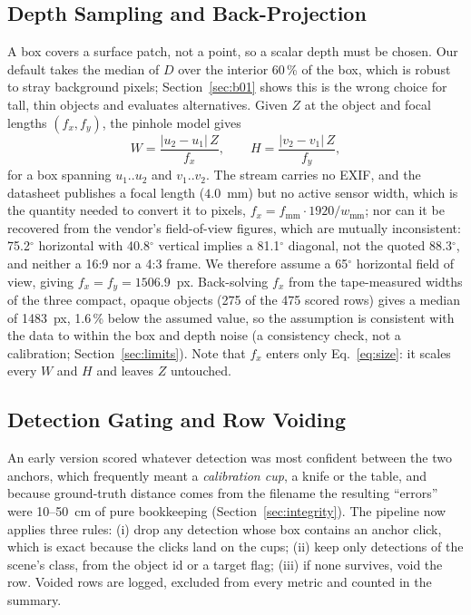 \documentclass[conference]{IEEEtran}
\begin{document}
\subsection{Depth Sampling and Back-Projection}
A box covers a surface patch, not a point, so a scalar depth must be chosen. Our
default takes the median of $D$ over the interior 60\,\% of the box, which is
robust to stray background pixels; Section~\ref{sec:b01} shows this is the wrong
choice for tall, thin objects and evaluates alternatives. Given $Z$ at the object
and focal lengths $(f_x,f_y)$, the pinhole model gives
\begin{equation}
W = \frac{|u_2-u_1|\,Z}{f_x}, \qquad
H = \frac{|v_2-v_1|\,Z}{f_y},
\label{eq:size}
\end{equation}
for a box spanning $u_1..u_2$ and $v_1..v_2$. The stream carries no EXIF, and the
datasheet publishes a focal length ($4.0$~mm) but no active sensor width, which
is the quantity needed to convert it to pixels,
$f_x = f_{\mathrm{mm}}\cdot 1920/w_{\mathrm{mm}}$; nor can it be recovered from
the vendor's field-of-view figures, which are mutually inconsistent: 75.2$^\circ$
horizontal with 40.8$^\circ$ vertical implies a 81.1$^\circ$ diagonal, not the
quoted 88.3$^\circ$, and neither a 16:9 nor a 4:3 frame. We therefore assume a
65$^\circ$ horizontal field of view, giving $f_x=f_y=1506.9$~px. Back-solving
$f_x$ from the tape-measured widths of the three compact, opaque objects (275 of
the 475 scored rows) gives a median of 1483~px, 1.6\,\% below the assumed value,
so the assumption is consistent with the data to within the box and depth noise
(a consistency check, not a calibration; Section~\ref{sec:limits}).
Note that $f_x$ enters only
Eq.~\eqref{eq:size}: it scales every $W$ and $H$ and leaves $Z$ untouched.

\subsection{Detection Gating and Row Voiding}
An early version scored whatever detection was most confident between the two
anchors, which frequently meant a \emph{calibration cup}, a knife or the table,
and because ground-truth distance comes from the filename the resulting
``errors'' were 10--50~cm of pure bookkeeping (Section~\ref{sec:integrity}). The
pipeline now applies three rules:
(i) drop any detection whose box contains an anchor click, which is exact because
the clicks land on the cups; (ii) keep only detections of the scene's class, from
the object id or a target flag; (iii) if none survives, void the row. Voided rows
are logged, excluded from every metric and counted in the summary.
\end{document}
